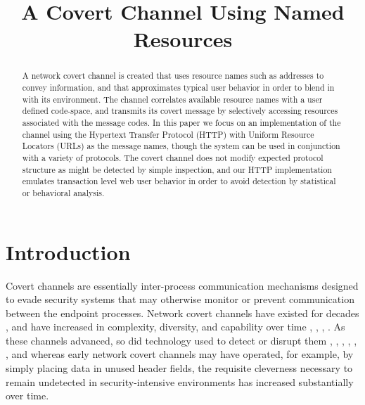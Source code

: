 \documentclass[10pt, conference]{IEEEtran}
\begin{document}
\title{A Covert Channel Using Named Resources}

\author{

\and

}

\maketitle
\thispagestyle{empty}

\begin{abstract}
A network covert channel is created that uses resource names such as addresses to convey information, and that approximates typical user behavior in order to blend in with its environment.  The channel correlates available resource names with a user defined code-space, and transmits its covert message by selectively accessing resources associated with the message codes.  In this paper we focus on an implementation of the channel using the Hypertext Transfer Protocol (HTTP) with Uniform Resource Locators (URLs) as the message names, though the system can be used in conjunction with a variety of protocols.  The covert channel does not modify expected protocol structure as might be detected by simple inspection, and our HTTP implementation emulates transaction level web user behavior in order to avoid detection by statistical or behavioral analysis.
\end{abstract}

\section{Introduction}

Covert channels are essentially inter-process communication mechanisms designed to evade security systems that may otherwise monitor or prevent communication between the endpoint processes.  Network covert channels have existed for decades \cite{Girling87}, and have increased in complexity, diversity, and capability over time \cite{Ahmadzadeh13}, \cite{Luo12},  \cite{Mazurczyk13}, \cite{Gasior11}.  As these channels advanced, so did technology used to detect or disrupt them \cite{Gilbert09}, \cite{Tumoian05}, \cite{Cabuk04}, \cite{Cabuk09}, \cite{Gianvecchio11}, \cite{Giles02}, and whereas early network covert channels may have operated, for example, by simply placing data in unused header fields, the requisite cleverness necessary to remain undetected in security-intensive environments has increased substantially over time.
\end{document}
